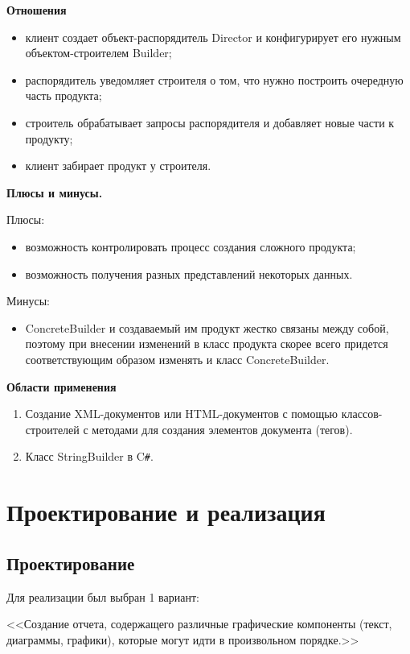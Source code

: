 \documentclass[PI,LAB]{HSEUniversity}
\begin{document}
\textbf{Отношения}
\begin{itemize}
  \item клиент создает объект-распорядитель Director и конфигурирует его нужным объектом-строителем Builder;
  \item распорядитель уведомляет строителя о том, что нужно построить очередную часть продукта;
  \item строитель обрабатывает запросы распорядителя и добавляет новые части к продукту;
  \item клиент забирает продукт у строителя.  
\end{itemize}

\textbf{Плюсы и минусы.}

Плюсы:
\begin{itemize}
   \item возможность контролировать процесс создания сложного продукта;
   \item возможность получения разных представлений некоторых данных. 
  \end{itemize}

Минусы:
\begin{itemize}
  \item ConcreteBuilder и создаваемый им продукт жестко связаны между собой, поэтому при внесении изменений в класс продукта скорее всего придется соответствующим образом изменять и класс ConcreteBuilder. 
\end{itemize}
\clearpage

\textbf{Области применения}

\begin{enumerate}
  \item Создание XML-документов или HTML-документов с помощью классов-строителей с методами для создания элементов документа (тегов).
  \item Класс StringBuilder в C\verb|#|.
\end{enumerate}

\chapter{Проектирование и реализация}
\section{Проектирование}
Для реализации был выбран 1 вариант:

<<Создание отчета, содержащего различные графические компоненты (текст, диаграммы, графики), которые могут идти в произвольном порядке.>>
\end{document}
